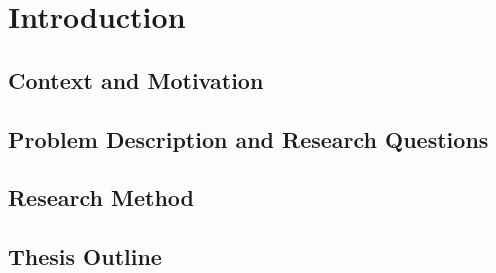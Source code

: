 \chapter{Introduction}
\label{chap:introduction}

\section{Context and Motivation}

\section{Problem Description and Research Questions}

\section{Research Method}

\section{Thesis Outline}


